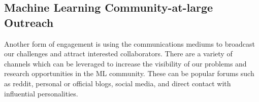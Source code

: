 



\subsection{Machine Learning Community-at-large Outreach}
Another form of engagement is using the communications mediums to broadcast our challenges and attract interested collaborators. There are a variety of channels which can be leveraged to increase the visibility of our problems and research opportunities in the ML community. These can be popular forums such as reddit, personal or official blogs, social media, and direct contact with influential personalities.\\

